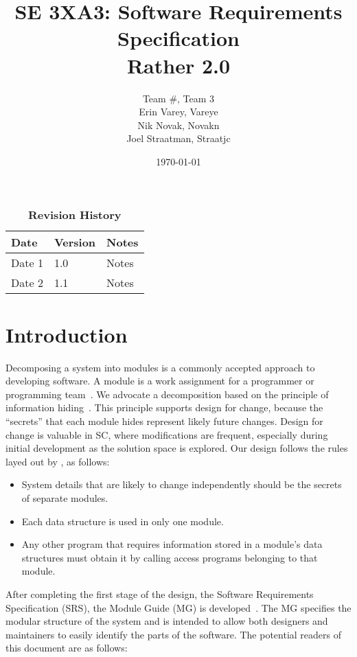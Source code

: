 \documentclass[12pt, titlepage]{article}
\title{SE 3XA3: Software Requirements Specification\\Rather 2.0}
\author{Team \#, Team 3
		\\ Erin Varey, Vareye
		\\ Nik Novak, Novakn
		\\ Joel Straatman, Straatjc
}
\date{\today}
\begin{document}
\maketitle
{}
\tableofcontents
\listoftables
\listoffigures
\begin{table}[bp]
\caption{\bf Revision History}
\begin{tabularx}{\textwidth}{p{3cm}p{2cm}X}
\toprule {\bf Date} & {\bf Version} & {\bf Notes}\\
\midrule
Date 1 & 1.0 & Notes\\
Date 2 & 1.1 & Notes\\
\bottomrule
\end{tabularx}
\end{table}
\newpage
{}
\section{Introduction}
Decomposing a system into modules is a commonly accepted approach to developing
software.  A module is a work assignment for a programmer or programming
team~\citep{ParnasEtAl1984}.  We advocate a decomposition
based on the principle of information hiding~\citep{Parnas1972a}.  This
principle supports design for change, because the ``secrets'' that each module
hides represent likely future changes.  Design for change is valuable in SC,
where modifications are frequent, especially during initial development as the
solution space is explored.  
Our design follows the rules layed out by \citet{ParnasEtAl1984}, as follows:
\begin{itemize}
\item System details that are likely to change independently should be the
  secrets of separate modules.
\item Each data structure is used in only one module.
\item Any other program that requires information stored in a module's data
  structures must obtain it by calling access programs belonging to that module.
\end{itemize}
After completing the first stage of the design, the Software Requirements
Specification (SRS), the Module Guide (MG) is developed~\citep{ParnasEtAl1984}. The MG
specifies the modular structure of the system and is intended to allow both
designers and maintainers to easily identify the parts of the software.  The
potential readers of this document are as follows:
\end{document}
